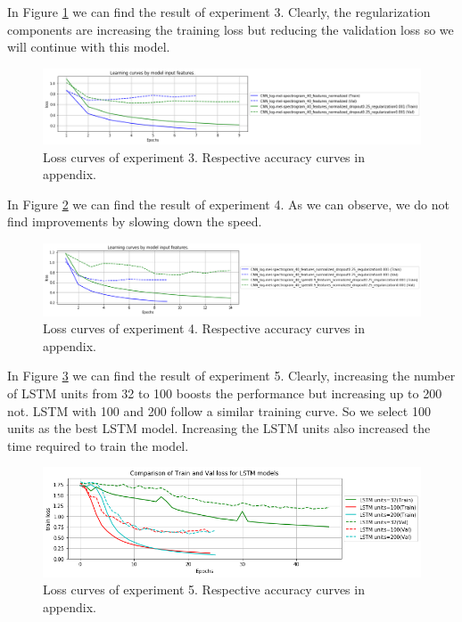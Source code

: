 \documentclass[12pt]{extarticle}
\begin{document}
\noindent In Figure \ref{fig8} we can find the result of experiment 3. Clearly, the regularization components are increasing the training loss but reducing the validation loss so we will continue with this model.
\begin{figure}[h]
\centering
\includegraphics[width=\linewidth]{Figures/7.png}
\caption{Loss curves of experiment 3. Respective accuracy curves in appendix.}
\label{fig8}
\end{figure}

\noindent In Figure \ref{fig9} we can find the result of experiment 4. As we can observe, we do not find improvements by slowing down the speed.

\begin{figure}[h]
\centering
\includegraphics[width=\linewidth]{Figures/8.png}
\caption{Loss curves of experiment 4. Respective accuracy curves in appendix.}
\label{fig9}
\end{figure}

\noindent In Figure \ref{fig10} we can find the result of experiment 5. Clearly, increasing the number of LSTM units from 32 to 100 boosts the performance but increasing up to 200 not. LSTM with 100 and 200 follow a similar training curve. So we select 100 units as the best LSTM model. Increasing the LSTM units also increased the time required to train the model. 

\begin{figure}[h]
\centering
\includegraphics[width=\linewidth]{Figures/11.png}
\caption{Loss curves of experiment 5. Respective accuracy curves in appendix.}
\label{fig10}
\end{figure}
\end{document}
